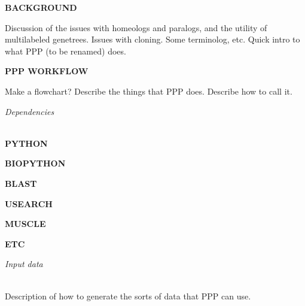 \documentclass[12pt,letterpaper]{article}
\renewcommand{\section}[1]{
\bigskip
\noindent
\begin{Large}
\textit{\textsf{#1}}
\medskip
\end{Large}
}
\renewcommand{\subsection}[1]{
\bigskip
\noindent
\textsf{\textbf{\MakeUppercase{#1}}}
}
\begin{document}
\subsection{Background} 
Discussion of the issues with homeologs and paralogs, and the utility of 
multilabeled genetrees. Issues with cloning. Some terminolog, etc.
Quick intro to what PPP (to be renamed) does.

\subsection{PPP workflow}
Make a flowchart? Describe the things that PPP does.
Describe how to call it.

\bigskip\section{Dependencies}\\ %
\subsection{Python}

\subsection{BioPython}

\subsection{Blast}

\subsection{USEARCH}

\subsection{MUSCLE}

\subsection{etc}

\bigskip\section{Input data}\\
Description of how to generate the sorts of data that PPP can use.
\end{document}
